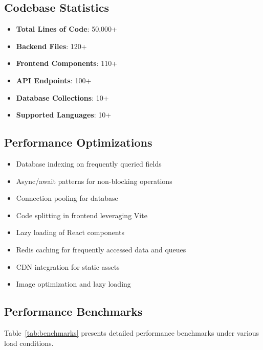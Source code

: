 \documentclass[conference]{IEEEtran}
\begin{document}
\subsection{Codebase Statistics}
\begin{itemize}
    \item \textbf{Total Lines of Code}: 50,000+
    \item \textbf{Backend Files}: 120+
    \item \textbf{Frontend Components}: 110+
    \item \textbf{API Endpoints}: 100+
    \item \textbf{Database Collections}: 10+
    \item \textbf{Supported Languages}: 10+
\end{itemize}

\subsection{Performance Optimizations}
\begin{itemize}
    \item Database indexing on frequently queried fields
    \item Async/await patterns for non-blocking operations
    \item Connection pooling for database
    \item Code splitting in frontend leveraging Vite
    \item Lazy loading of React components
    \item Redis caching for frequently accessed data and queues
    \item CDN integration for static assets
    \item Image optimization and lazy loading
\end{itemize}

\subsection{Performance Benchmarks}
Table~\ref{tab:benchmarks} presents detailed performance benchmarks under various load conditions.
\end{document}
